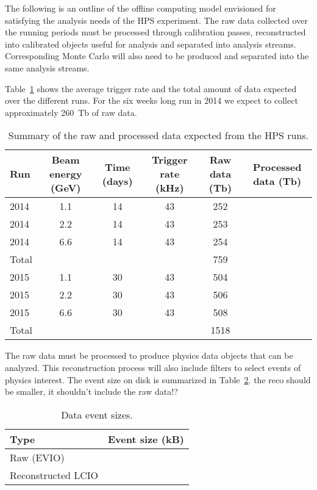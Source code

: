
The following is an outline of the offline computing model envisioned for satisfying the analysis needs of the HPS experiment. The raw data collected over the running periods must be processed through calibration passes, reconstructed into calibrated objects useful for analysis and separated into analysis streams. Corresponding Monte Carlo will also need to be produced and separated into the same analysis streams.

Table~\ref{tab:data_rates} shows the average trigger rate and the total amount of data expected over the 
different runs. For the six weeks long run in 2014 we expect to collect approximately 260~Tb of raw data.
\begin{table}[]
\centering
\begin{tabular}{|l|c|c|c|c|c|}
\hline
Run & Beam energy (GeV) & Time (days) & Trigger rate (kHz) & Raw data (Tb) & Processed data (Tb)\\
\hline
2014 & 1.1 & 14 & 43 & 252 &\\
2014 & 2.2 & 14 & 43 & 253 & \\
2014 & 6.6 & 14 & 43 & 254 & \\
\hline
Total & & & & 759 & \\
\hline
2015 & 1.1 & 30 & 43 & 504 &\\
2015 & 2.2 & 30 & 43 & 506 & \\
2015 & 6.6 & 30 & 43 & 508 & \\
\hline
Total & & & & 1518 & \\
\hline
\end{tabular}
\caption{{\small Summary of the raw and processed data expected from the HPS runs. }}
\label{tab:data_rates}
\end{table}
The raw data must be processed to produce physics data objects that can be analyzed. This reconstruction process will also include filters to select events of physics interest. The event size on disk is summarized 
in Table~\ref{tab:raw_data_size}. {\color{red} the reco should be smaller, it shouldn't include the raw data!?}
\begin{table}[]
\centering
\begin{tabular}{|l|c|}
\hline
Type & Event size (kB) \\ 
\hline
Raw (EVIO)  &  \\
\hline
Reconstructed LCIO & \\
\hline
\end{tabular}
\caption{{\small Data event sizes. }}
\label{tab:raw_data_size}
\end{table}

